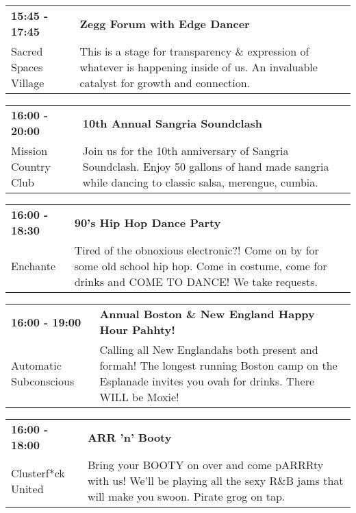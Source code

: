 \begin{tabular}{ p{1in} p{2.2in} }
    \textbf{15:45 - 17:45} & \textbf{Zegg Forum with Edge Dancer} \\
    Sacred Spaces Village \newline  & This is a stage for transparency \& expression of whatever is happening inside of us. An invaluable catalyst for growth and connection. \\
    \hline 
\end{tabular}
    
\begin{tabular}{ p{1in} p{2.2in} }
    \textbf{16:00 - 20:00} & \textbf{10th Annual Sangria Soundclash} \\
    Mission Country Club \newline  & Join us for the 10th anniversary of Sangria Soundclash. Enjoy 50 gallons of hand made sangria while dancing to classic salsa, merengue, cumbia. \\
    \hline 
\end{tabular}
    
\begin{tabular}{ p{1in} p{2.2in} }
    \textbf{16:00 - 18:30} & \textbf{90's Hip Hop Dance Party} \\
    Enchante \newline  & Tired of the obnoxious electronic?!  Come on by for some old school hip hop.  Come in costume, come for drinks and COME TO DANCE! We take requests. \\
    \hline 
\end{tabular}
    
\begin{tabular}{ p{1in} p{2.2in} }
    \textbf{16:00 - 19:00} & \textbf{Annual Boston \& New England Happy Hour Pahhty!} \\
    Automatic Subconscious \newline  & Calling all New Englandahs both present and formah! The longest running Boston camp on the Esplanade invites you ovah for drinks. There WILL be Moxie! \\
    \hline 
\end{tabular}
    
\begin{tabular}{ p{1in} p{2.2in} }
    \textbf{16:00 - 18:00} & \textbf{ARR 'n' Booty} \\
    Clusterf*ck United \newline  & Bring your BOOTY on over and come pARRRty with us! We'll be playing all the sexy R\&B jams that will make you swoon. Pirate grog on tap. \\
    \hline 
\end{tabular}
    
